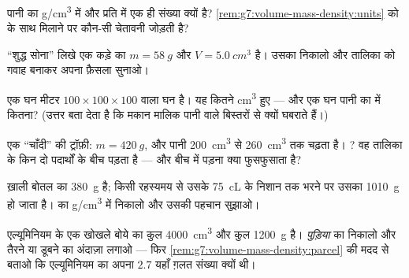 \begin{exercise}[$\star$]\label{exo:g7:volume-mass-density:6}
पानी का  \unit{g/cm^3} में और  प्रति  में एक ही
संख्या क्यों है? \cref{rem:g7:volume-mass-density:units}  को
 के साथ मिलाने पर कौन-सी चेतावनी जोड़ती है?
\end{exercise}

\begin{exercise}[$\star$]\label{exo:g7:volume-mass-density:7}
``शुद्ध सोना'' लिखे एक कड़े का $m = \qty{58}{g}$ और
$V = \qty{5.0}{cm^3}$ है। उसका  निकालो और तालिका को गवाह बनाकर
अपना फ़ैसला सुनाओ।
\end{exercise}

\begin{exercise}[$\star\star$]\label{exo:g7:volume-mass-density:8}
एक घन मीटर $100 \times 100 \times 100$  वाला घन है। यह
कितने \unit{cm^3} हुए --- और एक घन  पानी का  
में कितना? (उत्तर बता देता है कि मकान मालिक पानी वाले बिस्तरों से
क्यों घबराते हैं।)
\end{exercise}

\begin{exercise}[$\star\star$]\label{exo:g7:volume-mass-density:9}
एक ``चाँदी'' की ट्रॉफ़ी: $m = \qty{420}{g}$, और पानी
\qty{200}{cm^3} से \qty{260}{cm^3} तक चढ़ता है। ? वह तालिका के
किन दो पदार्थों के बीच पड़ता है --- और बीच में पड़ना क्या फुसफुसाता
है?
\end{exercise}

\begin{exercise}[$\star\star$]\label{exo:g7:volume-mass-density:10}
ख़ाली बोतल का  \qty{380}{g} है; किसी रहस्यमय  से उसके
\qty{75}{cL} के निशान तक भरने पर उसका  \qty{1010}{g} हो जाता है।
 का  \unit{g/cm^3} में निकालो और उसकी पहचान सुझाओ।
\end{exercise}

\begin{exercise}[$\star\star$]\label{exo:g7:volume-mass-density:11}
एल्यूमिनियम के एक खोखले बोये का कुल  \qty{4000}{cm^3} और कुल
 \qty{1200}{g} है। \emph{पुड़िया} का  निकालो और तैरने या
डूबने का अंदाज़ा लगाओ --- फिर
\cref{rem:g7:volume-mass-density:parcel} की मदद से बताओ कि
एल्यूमिनियम का अपना $2.7$ यहाँ ग़लत संख्या क्यों थी।
\end{exercise}

